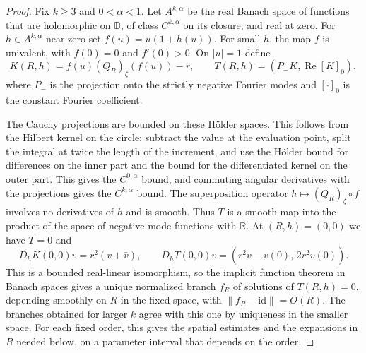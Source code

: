 \begin{proof}
Fix $k\geq3$ and $0<\alpha<1$. Let $A^{k,\alpha}$ be the real Banach space of functions that are holomorphic on $\mathbb D$, of class $C^{k,\alpha}$ on its closure, and real at zero. For $h\in A^{k,\alpha}$ near zero set $f(u)=u(1+h(u))$. For small $h$, the map $f$ is univalent, with $f(0)=0$ and $f'(0)>0$. On $|u|=1$ define
\[
 K(R,h)=f(u)(Q_R)_\zeta(f(u))-r,
 \qquad T(R,h)=(P_-K,\operatorname{Re}[K]_0),
\]
where $P_-$ is the projection onto the strictly negative Fourier modes and $[\cdot]_0$ is the constant Fourier coefficient.

The Cauchy projections are bounded on these H\"older spaces. This follows from the Hilbert kernel on the circle: subtract the value at the evaluation point, split the integral at twice the length of the increment, and use the H\"older bound for differences on the inner part and the bound for the differentiated kernel on the outer part. This gives the $C^{0,\alpha}$ bound, and commuting angular derivatives with the projections gives the $C^{k,\alpha}$ bound. The superposition operator $h\mapsto(Q_R)_\zeta\circ f$ involves no derivatives of $h$ and is smooth. Thus $T$ is a smooth map into the product of the space of negative-mode functions with $\mathbb R$. At $(R,h)=(0,0)$ we have $T=0$ and
\[
 D_hK(0,0)v=r^2(v+\bar v),\qquad
 D_hT(0,0)v=(r^2\overline{v-v(0)},\,2r^2v(0)).
\]
This is a bounded real-linear isomorphism, so the implicit function theorem in Banach spaces gives a unique normalized branch $f_R$ of solutions of $T(R,h)=0$, depending smoothly on $R$ in the fixed space, with $\|f_R-\mathrm{id}\|=O(R)$. The branches obtained for larger $k$ agree with this one by uniqueness in the smaller space. For each fixed order, this gives the spatial estimates and the expansions in $R$ needed below, on a parameter interval that depends on the order.


\end{proof}
